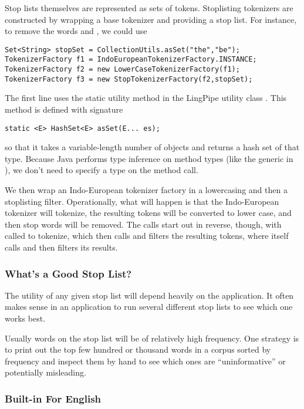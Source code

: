 Stop lists themselves are represented as sets of tokens.  Stoplisting
tokenizers are constructed by wrapping a base tokenizer and providing
a stop list.  For instance, to remove the words  and
, we could use
%
\begin{verbatim}
Set<String> stopSet = CollectionUtils.asSet("the","be");
TokenizerFactory f1 = IndoEuropeanTokenizerFactory.INSTANCE;
TokenizerFactory f2 = new LowerCaseTokenizerFactory(f1);
TokenizerFactory f3 = new StopTokenizerFactory(f2,stopSet);
\end{verbatim}
%
The first line uses the static utility method 
in the LingPipe utility class .  This
method is defined with signature 
%
\begin{verbatim}
static <E> HashSet<E> asSet(E... es);
\end{verbatim}
%
so that it takes a variable-length number of  objects and
returns a hash set of that type.  Because Java performs type inference
on method types (like the  generic in ),
we don't need to specify a type on the method call.

We then wrap an Indo-European tokenizer factory in a lowercasing and
then a stoplisting filter.  Operationally, what will happen is that
the Indo-European tokenizer will tokenize, the resulting tokens will
be converted to lower case, and then stop words will be removed.  The
calls start out in reverse, though, with  called to tokenize,
which then calls  and filters the resulting tokens, where
 itself calls  and then filters its results.

\subsubsection{What's a Good Stop List?}

The utility of any given stop list will depend heavily on the
application.  It often makes sense in an application to run several
different stop lists to see which one works best.  

Usually words on the stop list will be of relatively high
frequency.  One strategy is to print out the top few hundred
or thousand words in a corpus sorted by frequency and inspect
them by hand to see which ones are ``uninformative'' or potentially
misleading.

\subsubsection{Built-in For English}

